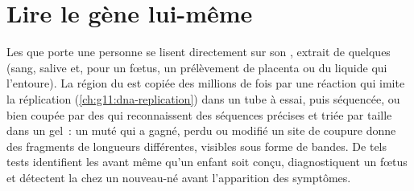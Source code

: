 \section{Lire le gène lui-même}

\begin{proposition}\label{prop:g11:genes-and-disease:testing}
Les  que porte une personne se lisent directement sur son ,
extrait de quelques  (sang, salive et, pour un fœtus, un
prélèvement de placenta ou du liquide qui l'entoure). La région du 
est copiée des millions de fois par une réaction qui imite la
réplication (\cref{ch:g11:dna-replication}) dans un tube à essai, puis
séquencée, ou bien coupée par des  qui reconnaissent des
séquences précises et triée par taille dans un gel~: un  muté qui
a gagné, perdu ou modifié un site de coupure donne des fragments de
longueurs différentes, visibles sous forme de bandes. De tels tests
identifient les  avant même qu'un enfant soit conçu,
diagnostiquent un fœtus et détectent la  chez un nouveau-né
avant l'apparition des symptômes.
\end{proposition}
\admitted

